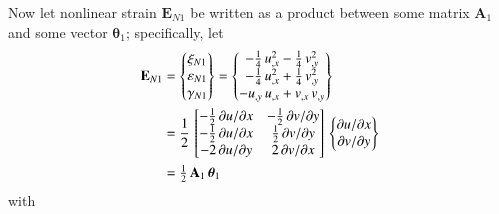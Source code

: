 Now let nonlinear strain $\boldsymbol{E}_{N1}$ be written as a product between some matrix $\mathbf{A}_1$ and some vector $\boldsymbol{\theta}_1$; specifically, let
\begin{equation}
\begin{aligned}
\mathbf{E}_{N1} & =  \begin{Bmatrix}
\mathrm \xi_{N1} \\
\mathrm \varepsilon_{N1} \\
\mathrm \gamma_{N1} \end{Bmatrix} =
\begin{Bmatrix}
-\tfrac{1}{4} \, u_{,x}^2 -   \tfrac{1}{4} \, v_{,y}^2 \\
-\tfrac{1}{4} \, u_{,x}^2 + \tfrac{1}{4} \, v_{,y}^2 \\
-u_{,y} \, u_{,x} + v_{,x} \, v_{,y} \end{Bmatrix} \notag \\
& = \frac{1}{2} \, \begin{bmatrix}
-\tfrac{1}{2} \, \partial u / \partial x &  - \tfrac{1}{2} \, \partial v / \partial y \\
-\tfrac{1}{2} \, \partial u / \partial x &  \tfrac{1}{2} \, \partial v / \partial y \\
-2 \, \partial u / \partial y  & 2 \, \partial v / \partial x  \end{bmatrix} \, \begin{Bmatrix}
\partial u / \partial x\\
\partial v / \partial y
\end{Bmatrix}\\
& = \tfrac{1}{2} \, \mathbf{A}_1 \, \boldsymbol{\theta}_1
\end{aligned}
\end{equation}
with 
